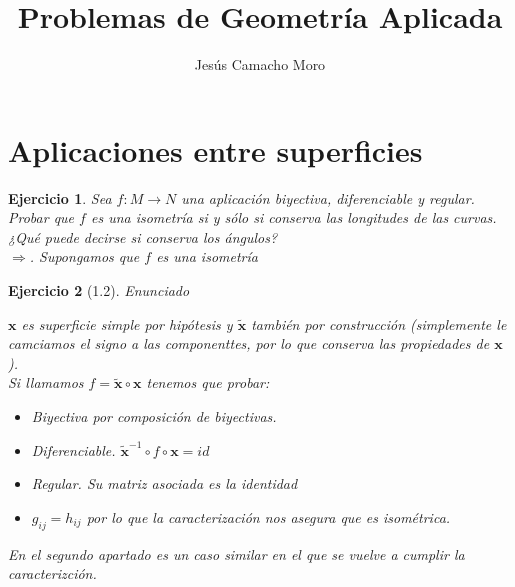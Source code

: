 \documentclass[a4paper,10pt]{article}
\title{Problemas de Geometría Aplicada}
\author{Jesús Camacho Moro}
\newtheorem{ejercicio}{Ejercicio}[section]
\begin{document}
\maketitle

\section{Aplicaciones entre superficies}
\begin{ejercicio}
	Sea $f:M\longrightarrow N$ una aplicación biyectiva, diferenciable y regular. Probar que $f$ es una isometría si y sólo si conserva las longitudes de las curvas. ¿Qué puede decirse si conserva los ángulos?\\
	$\Longrightarrow$. Supongamos que $f$ es una isometría
\end{ejercicio}

\newpage

\begin{ejercicio}[1.2]
Enunciado

$\mathbf{x}$ es superficie simple por hipótesis y $\tilde{\mathbf{x}}$ también por construcción (simplemente le camciamos el signo a las componenttes, por lo que conserva las propiedades de $\mathbf{x}$).\\

Si llamamos $f=\tilde{\mathbf{x}}\circ \mathbf{x}$ tenemos que probar:
\begin{itemize}
\item Biyectiva por composición de biyectivas.
\item Diferenciable. $\tilde{\mathbf{x}}^{-1}\circ f\circ \mathbf{x}=id$
\item Regular. Su matriz asociada es la identidad
\item $g_{ij}=h_{ij}$ por lo que la caracterización nos asegura que es isométrica.
\end{itemize}

En el segundo apartado es un caso similar en el que se vuelve a cumplir la caracterizción.
\end{ejercicio}
\end{document}
